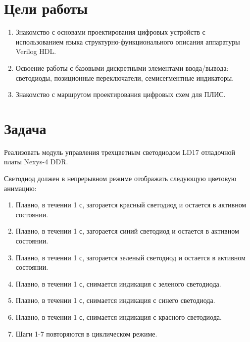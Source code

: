 
\usepackage{hyperref}
\hypersetup{pdftex,colorlinks=true,allcolors=black}
\usepackage{hypcap}
\fancyhead[LR]{}

\def \labnum {1}
\def \labsubj {Схемотехника ЭВМ}
\def \labauthor {Айтуганов Д. А. \\ Чебыкин И. Б.}
\def \labgroup {P3301}
\def \labinsp {Баевских А. Н.}
\def \labname {Вариант: 2}

\isnametrue
\lstset{  
	caption=\lstname,
	basicstyle=\ttfamily\selectfont\scriptsize
}



\tableofcontents
\newpage
\section{Цели работы}
\begin{enumerate}
\item Знакомство с основами проектирования цифровых устройств с использованием языка
структурно-функционального описания аппаратуры Verilog HDL.
\item Освоение работы с базовыми дискретными элементами ввода/вывода: светодиоды,
позиционные переключатели, семисегментные индикаторы.
\item Знакомство с маршрутом проектирования цифровых схем для ПЛИС.
\end{enumerate}

\section{Задача}
Реализовать модуль управления трехцветным светодиодом LD17 отладочной платы Nexys-4 DDR.

Светодиод должен в непрерывном режиме отображать следующую цветовую
анимацию:
\begin{enumerate}
\item Плавно, в течении 1 с, загорается красный светодиод и остается в активном
состоянии.
\item Плавно, в течении 1 с, загорается синий светодиод и остается в активном
состоянии.
\item Плавно, в течении 1 с, загорается зеленый светодиод и остается в активном
состоянии.
\item Плавно, в течении 1 с, снимается индикация с зеленого светодиода.
\item Плавно, в течении 1 с, снимается индикация с синего светодиода.
\item Плавно, в течении 1 с, снимается индикация с красного светодиода.
\item Шаги 1-7 повторяются в циклическом режиме.
\end{enumerate}

